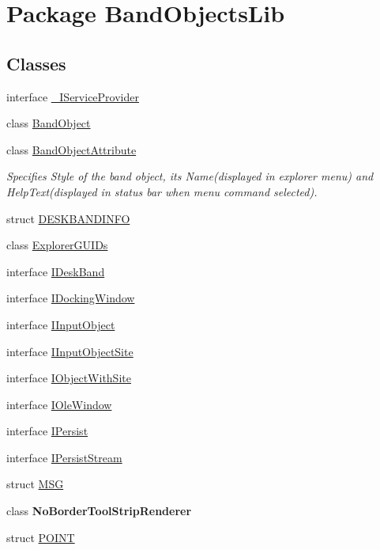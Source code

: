 \hypertarget{namespace_band_objects_lib}{\section{Package Band\+Objects\+Lib}
\label{namespace_band_objects_lib}
}
\subsection*{Classes}
\begin{DoxyCompactItemize}
\item 
interface \hyperlink{interface_band_objects_lib_1_1___i_service_provider}{\+\_\+\+I\+Service\+Provider}
\item 
class \hyperlink{class_band_objects_lib_1_1_band_object}{Band\+Object}
\item 
class \hyperlink{class_band_objects_lib_1_1_band_object_attribute}{Band\+Object\+Attribute}
\begin{DoxyCompactList}\small\item\em Specifies Style of the band object, its Name(displayed in explorer menu) and Help\+Text(displayed in status bar when menu command selected). \end{DoxyCompactList}\item 
struct \hyperlink{struct_band_objects_lib_1_1_d_e_s_k_b_a_n_d_i_n_f_o}{D\+E\+S\+K\+B\+A\+N\+D\+I\+N\+F\+O}
\item 
class \hyperlink{class_band_objects_lib_1_1_explorer_g_u_i_ds}{Explorer\+G\+U\+I\+Ds}
\item 
interface \hyperlink{interface_band_objects_lib_1_1_i_desk_band}{I\+Desk\+Band}
\item 
interface \hyperlink{interface_band_objects_lib_1_1_i_docking_window}{I\+Docking\+Window}
\item 
interface \hyperlink{interface_band_objects_lib_1_1_i_input_object}{I\+Input\+Object}
\item 
interface \hyperlink{interface_band_objects_lib_1_1_i_input_object_site}{I\+Input\+Object\+Site}
\item 
interface \hyperlink{interface_band_objects_lib_1_1_i_object_with_site}{I\+Object\+With\+Site}
\item 
interface \hyperlink{interface_band_objects_lib_1_1_i_ole_window}{I\+Ole\+Window}
\item 
interface \hyperlink{interface_band_objects_lib_1_1_i_persist}{I\+Persist}
\item 
interface \hyperlink{interface_band_objects_lib_1_1_i_persist_stream}{I\+Persist\+Stream}
\item 
struct \hyperlink{struct_band_objects_lib_1_1_m_s_g}{M\+S\+G}
\item 
class {\bfseries No\+Border\+Tool\+Strip\+Renderer}
\item 
struct \hyperlink{struct_band_objects_lib_1_1_p_o_i_n_t}{P\+O\+I\+N\+T}
\end{DoxyCompactItemize}
